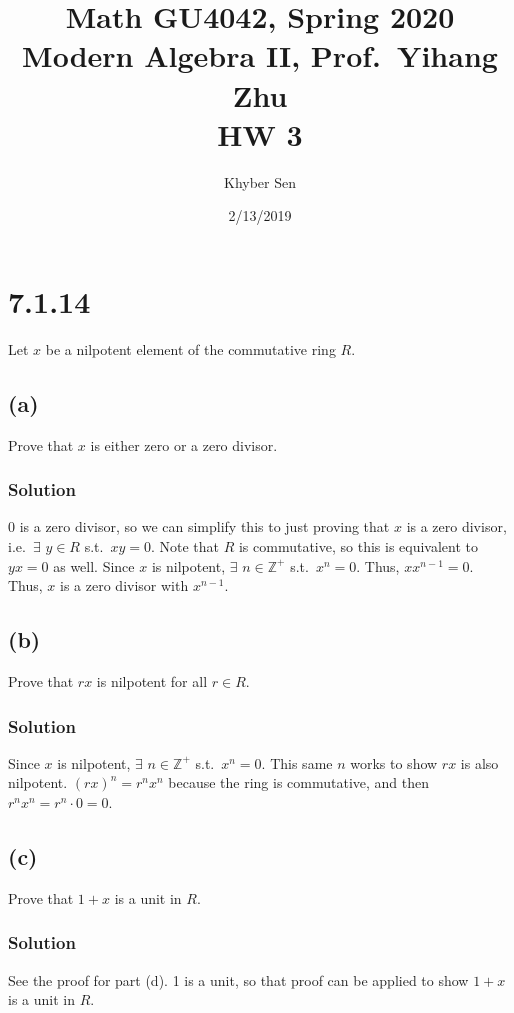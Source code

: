 \documentclass[fleqn]{article}
\title{
Math GU4042, Spring 2020 \\
Modern Algebra II, Prof.\ Yihang Zhu \\
HW 3
}
\author{Khyber Sen}
\date{2/13/2019}
\begin{document}
    
    \maketitle
    
    \section{7.1.14}
    Let $x$ be a nilpotent element of the commutative ring $R$.
        
        \subsection{(a)}
        Prove that $x$ is either zero or a zero divisor.
            
            \subsubsection{Solution}
            0 is a zero divisor, so we can simplify this to just proving that $x$ is a zero divisor, i.e.\ $\exists$ $y \in R$ s.t.\ $xy = 0$.  Note that $R$ is commutative, so this is equivalent to $yx = 0$ as well.  Since $x$ is nilpotent, $\exists$ $n \in \mathbb{Z}^+$ s.t.\ $x^n = 0$.  Thus, $x x^{n - 1} = 0$.  Thus, $x$ is a zero divisor with $x^{n - 1}$.
        
        \subsection{(b)}
        Prove that $rx$ is nilpotent for all $r \in R$.
            
            \subsubsection{Solution}
            Since $x$ is nilpotent, $\exists$ $n \in \mathbb{Z}^+$ s.t.\ $x^n = 0$.  This same $n$ works to show $rx$ is also nilpotent.  $(rx)^n = r^n x^n$ because the ring is commutative, and then $r^n x^n = r^n \cdot 0 = 0$.
        
        \subsection{(c)}
        Prove that $1 + x$ is a unit in $R$.
            
            \subsubsection{Solution}
            See the proof for part (d).  1 is a unit, so that proof can be applied to show $1 + x$ is a unit in $R$.
        
\end{document}
